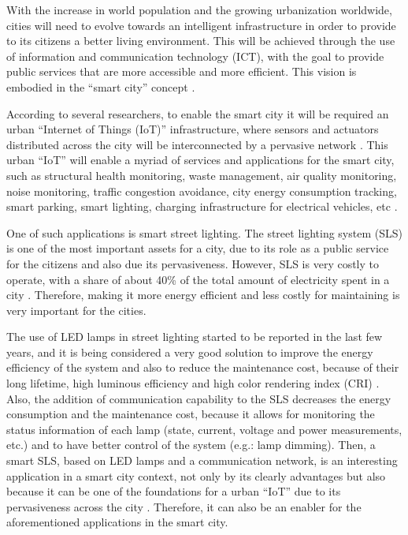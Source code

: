 \documentclass[final,authoryear,3p,twocolumn]{elsarticle}
\begin{document}
With  the increase in world population and the growing urbanization worldwide, cities will need to evolve towards an intelligent infrastructure in order to provide to its citizens a better living environment. This will be achieved through the use of information and communication technology (ICT), with the goal to provide public services that are more accessible and more efficient. This vision is embodied in the ``smart city'' concept \citep{Smart_City_2011, Smart_City_2013}. 

According to several researchers, to enable the smart city it will be required an urban ``Internet of Things (IoT)'' infrastructure, where sensors and actuators distributed across the city will be interconnected by a pervasive network \citep{Smart_City_IOT_2013,Smart_City_IOT_2014,Smart_City_IOT_2014b,Smart_City_IOT_2014c,Smart_City_IOT_2014d,
Smart_City_IOT_2014e}. 
This urban ``IoT'' will enable a myriad of services and applications for the smart city, such as structural health monitoring, waste management, air quality monitoring, noise monitoring, traffic congestion avoidance, city energy consumption tracking, smart parking, smart lighting, charging infrastructure for electrical vehicles, etc \citep{Smart_City_2011, Smart_City_2013}.

One of such applications is smart street lighting. The street lighting system (SLS) is one of the most important assets for a city, due to its role as a public service for the citizens and also due its pervasiveness. However, SLS is very costly to operate, with a share of about 40\% of the total amount of electricity spent in a city \citep{Smart_City_Smart_Light_2013}. Therefore, making it more energy efficient and less costly for maintaining is very important for the cities.

The use of LED lamps in street lighting started to be reported in the last few years, and it is being considered a very good solution to improve the energy efficiency of the system and also to reduce the maintenance cost, because of their long lifetime, high luminous efficiency and high color rendering index (CRI) \citep{CRI_2008,CRI_2010}. Also, the addition of communication capability to the SLS decreases the energy consumption and the maintenance cost, because it allows for monitoring the status information of each lamp (state, current, voltage and power measurements, etc.) and to have better control of the system (e.g.: lamp dimming). Then, a smart SLS, based on LED lamps and a communication network, is an interesting application in a smart city context, not only by its clearly advantages but also because it can be one of the foundations for a urban ``IoT'' due to its pervasiveness across the city \citep{Smart_City_Smart_Light_2013}. Therefore, it can also be an enabler for the aforementioned applications in the smart city.
\end{document}
